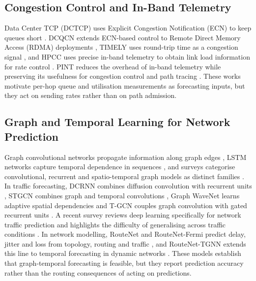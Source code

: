 \documentclass[conference]{IEEEtran}
\begin{document}
\subsection{Congestion Control and In-Band Telemetry}
Data Center TCP (DCTCP) uses Explicit Congestion Notification (ECN) to keep queues short \cite{alizadeh2010dctcp}. DCQCN extends ECN-based control to Remote Direct Memory Access (RDMA) deployments \cite{zhu2015dcqcn}, TIMELY uses round-trip time as a congestion signal \cite{mittal2015timely}, and HPCC uses precise in-band telemetry to obtain link load information for rate control \cite{li2019hpcc}. PINT reduces the overhead of in-band telemetry while preserving its usefulness for congestion control and path tracing \cite{benbasat2020pint}. These works motivate per-hop queue and utilisation measurements as forecasting inputs, but they act on sending rates rather than on path admission.

\subsection{Graph and Temporal Learning for Network Prediction}
Graph convolutional networks propagate information along graph edges \cite{kipf2017gcn}, LSTM networks capture temporal dependence in sequences \cite{hochreiter1997lstm}, and surveys categorise convolutional, recurrent and spatio-temporal graph models as distinct families \cite{wu2021gnnsurvey}. In traffic forecasting, DCRNN combines diffusion convolution with recurrent units \cite{li2018dcrnn}, STGCN combines graph and temporal convolutions \cite{yu2018stgcn}, Graph WaveNet learns adaptive spatial dependencies \cite{wu2019graphwavenet} and T-GCN couples graph convolution with gated recurrent units \cite{zhao2020tgcn}. A recent survey reviews deep learning specifically for network traffic prediction and highlights the difficulty of generalising across traffic conditions \cite{aouedi2025survey}. In network modelling, RouteNet and RouteNet-Fermi predict delay, jitter and loss from topology, routing and traffic \cite{rusek2020routenet,ferriol2023routenetfermi}, and RouteNet-TGNN extends this line to temporal forecasting in dynamic networks \cite{ahmad2026routenettgnn}. These models establish that graph-temporal forecasting is feasible, but they report prediction accuracy rather than the routing consequences of acting on predictions.
\end{document}
